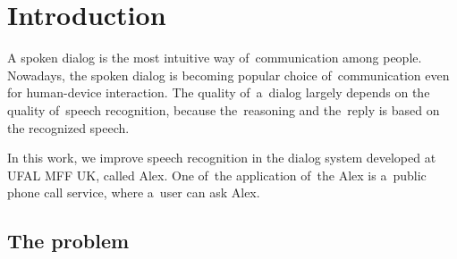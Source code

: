 \chapter{Introduction}
\label{chap:intro}

% 
% 
% 

A spoken dialog is the most intuitive way of~communication among people. Nowadays, the spoken dialog is becoming popular 
choice of~communication even for human-device interaction. The quality of~a~dialog largely depends on the quality 
of~speech recognition, because the~reasoning and the~reply is based on the recognized speech. 

In this work, we improve speech recognition in the dialog system developed at \acs{UFAL} \acs{MFF} \acs{UK}, 
called Alex. One of~the application of~the Alex is a~public phone call service, where a~user can ask Alex.

\section{The problem} 
\label{sec:why}

